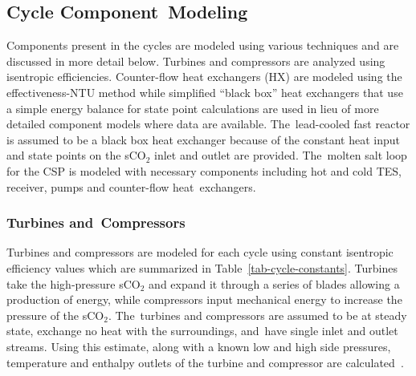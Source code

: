 \documentclass[sustainability,article,accept,moreauthors,pdftex]{Definitions/mdpi}
\begin{document}



\subsection{Cycle Component~Modeling}
Components present in the cycles are modeled using various techniques and are discussed in more detail below. Turbines and compressors are analyzed using isentropic efficiencies. Counter-flow heat exchangers (HX) are modeled using the effectiveness-NTU method while simplified ``black box'' heat exchangers that use a simple energy balance for state point calculations are used in lieu of more detailed component models where data are available. The~lead-cooled fast reactor is assumed to be a black box heat exchanger because of the constant heat input and state points on the sCO$_2$ inlet and outlet are provided. The~molten salt loop for the CSP is modeled with necessary components including hot and cold TES, receiver, pumps and counter-flow heat~exchangers.



\subsubsection{Turbines and~Compressors }

Turbines and compressors are modeled for each cycle using constant isentropic efficiency values which are summarized in Table~\ref{tab-cycle-constants}. Turbines take the high-pressure sCO$_2$ and expand it through a series of blades allowing a production of energy, while compressors input mechanical energy to increase the pressure of the sCO$_2$. The~turbines and compressors are assumed to be at steady state, exchange no heat with the surroundings, and~have single inlet and outlet streams. Using this estimate, along with a known low and high side pressures, temperature and enthalpy outlets of the turbine and compressor are calculated~\cite{klein_nellis_2011}. 
\end{document}
